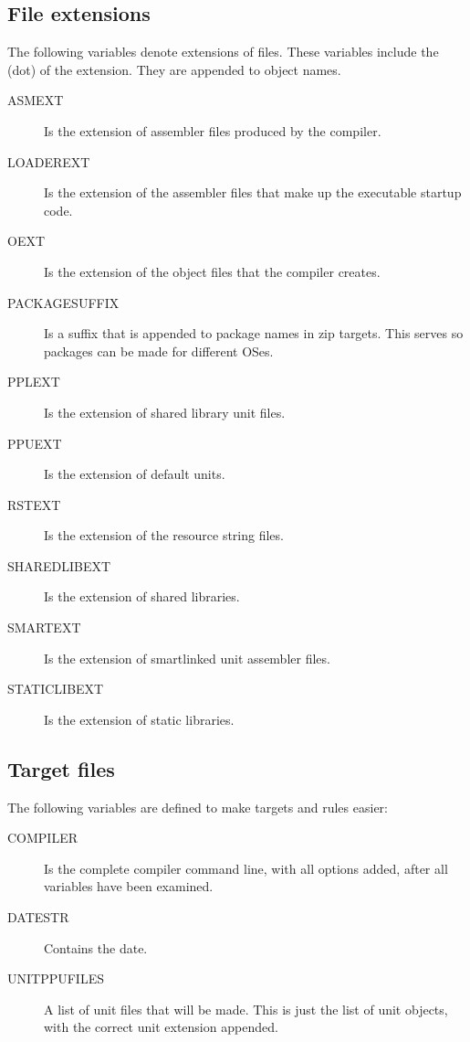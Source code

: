 \subsection{File extensions}

The following variables denote extensions of files. These variables include
the  (dot) of the extension. They are appended to object names.

\begin{description}
\item[ASMEXT] Is the extension of assembler files produced by the compiler.
\item[LOADEREXT] Is the extension of the assembler files that make up the
executable startup code.
\item[OEXT] Is the extension of the object files that the compiler creates.
\item[PACKAGESUFFIX] Is a suffix that is appended to package names in zip
targets. This serves so packages can be made for different OSes.
\item[PPLEXT] Is the extension of shared library unit files.
\item[PPUEXT] Is the extension of default units.
\item[RSTEXT] Is the extension of the  resource string files.
\item[SHAREDLIBEXT] Is the extension of shared libraries.
\item[SMARTEXT] Is the extension of smartlinked unit assembler files.
\item[STATICLIBEXT] Is the extension of static libraries.
\end{description}

\subsection{Target files}

The following variables are defined to make targets and rules easier:
\begin{description}
\item[COMPILER] Is the complete compiler command line, with all options
added, after all  variables have been examined.
\item[DATESTR] Contains the date.
\item[UNITPPUFILES] A list of unit files that will be made. This is just
the list of unit objects, with the correct unit extension appended.
\end{description}

